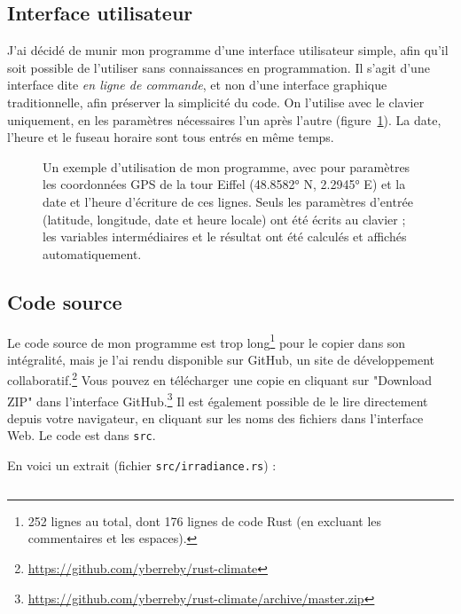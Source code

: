 \documentclass[12pt]{article}
\begin{document}
\subsection{Interface utilisateur}

J'ai décidé de munir mon programme d'une interface utilisateur simple, afin qu'il soit possible de l'utiliser sans connaissances en programmation. Il s'agit d'une interface dite \emph{en ligne de commande}, et non d'une interface graphique traditionnelle, afin préserver la simplicité du code. On l'utilise avec le clavier uniquement, en les paramètres nécessaires l'un après l'autre (figure~\ref{fig:demo}). La date, l'heure et le fuseau horaire sont tous entrés en même temps.

\begin{figure}[!htbp]
  \centering
  \caption{Un exemple d'utilisation de mon programme, avec pour paramètres les coordonnées GPS de la tour Eiffel (48.8582° N, 2.2945° E) et la date et l'heure d'écriture de ces lignes. Seuls les paramètres d'entrée (latitude, longitude, date et heure locale) ont été écrits au clavier ; les variables intermédiaires et le résultat ont été calculés et affichés automatiquement.}
  \label{fig:demo}
\end{figure}


\FloatBarrier
\subsection{Code source}

Le code source de mon programme est trop long\footnote{252 lignes au total, dont 176 lignes de code Rust (en excluant les commentaires et les espaces).} pour le copier dans son intégralité, mais je l'ai rendu disponible sur GitHub, un site de développement collaboratif.\footnote{\url{https://github.com/yberreby/rust-climate}}
Vous pouvez en télécharger une copie en cliquant sur "Download ZIP" dans l'interface GitHub.\footnote{\url{https://github.com/yberreby/rust-climate/archive/master.zip}}
Il est également possible de le lire directement depuis votre navigateur, en cliquant sur les noms des fichiers dans l'interface Web.
Le code est dans \texttt{src}.

En voici un extrait (fichier \texttt{src/irradiance.rs}) :

\inputminted[linenos]{rust}{rust-climate/src/irradiance.rs}



\clearpage
\end{document}

